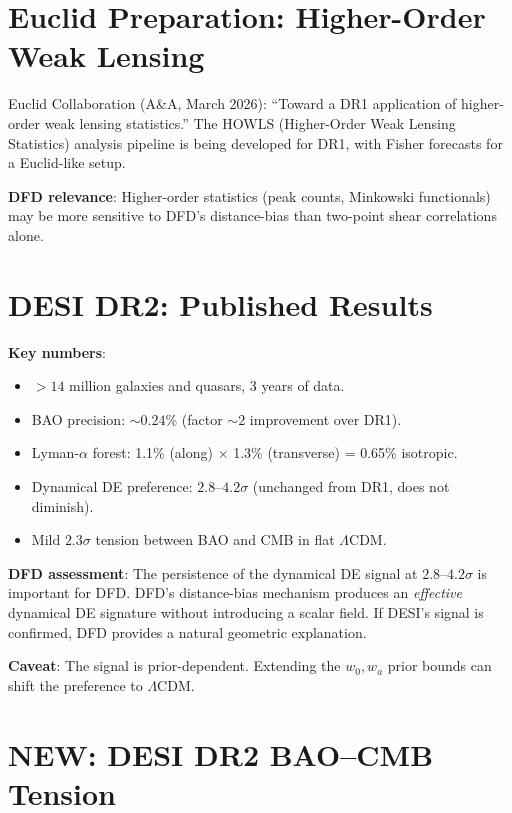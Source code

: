 \documentclass[11pt,a4paper]{article}
\newcommand{\NEW}{\textcolor{dfdblue}{\textbf{NEW}}}
\begin{document}
\section{Euclid Preparation: Higher-Order Weak Lensing}

Euclid Collaboration (A\&A, March 2026): ``Toward a DR1 application of higher-order weak lensing statistics.'' The HOWLS (Higher-Order Weak Lensing Statistics) analysis pipeline is being developed for DR1, with Fisher forecasts for a Euclid-like setup.

\textbf{DFD relevance}: Higher-order statistics (peak counts, Minkowski functionals) may be more sensitive to DFD's distance-bias than two-point shear correlations alone.

\section{DESI DR2: Published Results}

\begin{tcolorbox}[colback=blue!5!white, colframe=blue!60!black,
  title={DESI DR2 BAO: Published in Phys.\ Rev.\ D (October 2025)}]

\textbf{Key numbers}:
\begin{itemize}
\item $> 14$ million galaxies and quasars, 3 years of data.
\item BAO precision: $\sim 0.24\%$ (factor $\sim 2$ improvement over DR1).
\item Lyman-$\alpha$ forest: 1.1\% (along) $\times$ 1.3\% (transverse) = 0.65\% isotropic.
\item Dynamical DE preference: $2.8$--$4.2\sigma$ (unchanged from DR1, does not diminish).
\item Mild $2.3\sigma$ tension between BAO and CMB in flat $\Lambda$CDM.
\end{itemize}

\textbf{DFD assessment}: The persistence of the dynamical DE signal at $2.8$--$4.2\sigma$ is important for DFD. DFD's distance-bias mechanism produces an \emph{effective} dynamical DE signature without introducing a scalar field. If DESI's signal is confirmed, DFD provides a natural geometric explanation.

\textbf{Caveat}: The signal is prior-dependent. Extending the $w_0, w_a$ prior bounds can shift the preference to $\Lambda$CDM.
\end{tcolorbox}

\section{\NEW: DESI DR2 BAO--CMB Tension}
\end{document}

